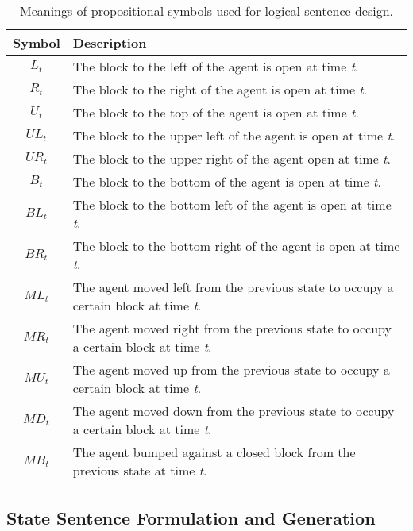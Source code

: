 \begin{table}[H]
  \begin{center}
    
    \begin{tabular}{c|l}
    
      \textbf{Symbol} & \textbf{Description} \\ 
      \hline
      $L_t$ & The block to the left of the agent is open at time \textit{t}. \\ 
      $R_t$ & The block to the right of the agent is open at time \textit{t}. \\  
      $U_t$ & The block to the top of the agent is open at time \textit{t}. \\   
      ${UL}_t$ & The block to the upper left of the agent is open at time \textit{t}. \\  
      ${UR}_t$ & The block to the upper right of the agent open at time \textit{t}. \\  
      $B_t$ & The block to the bottom of the agent is open at time \textit{t}. \\  
      ${BL}_t$ & The block to the bottom left of the agent is open at time \textit{t}. \\  
      ${BR}_t$ & The block to the bottom right of the agent is open at time \textit{t}. \\    
      ${ML}_t$ & The agent moved left from the previous state to occupy a certain block at time \textit{t}.\\ 
      ${MR}_t$ & The agent moved right from the previous state to occupy a certain block at time \textit{t}.\\ 
      ${MU}_t$ & The agent moved up from the previous state to occupy a certain block at time \textit{t}.\\  
      ${MD}_t$ & The agent moved down from the previous state to occupy a certain block at time \textit{t}.\\  
      ${MB}_t$ & The agent bumped against a closed block from the previous state at time \textit{t}.
    \end{tabular}
  \end{center}
\caption{Meanings of propositional symbols used for logical sentence design.}
\end{table}
\label{table:symbol_description}



\subsection{State Sentence Formulation and Generation}
\label{subsec:state_sentence_form}

